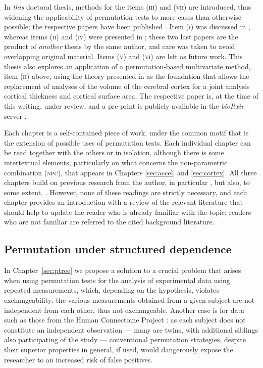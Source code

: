 In \emph{this} doctoral thesis, methods for the items (\textsc{iii}) and (\textsc{vii}) are introduced, thus widening the applicability of permutation tests to more cases than otherwise possible; the respective papers have been published \citep{Winkler2015, Winkler2016_fast}. Item (\textsc{i}) was discussed in \citet{Winkler2014}, whereas items (\textsc{ii}) and (\textsc{iv}) were presented in \citet{Winkler2016_npc}; these two last papers are the product of \emph{another} thesis by the same author, and care was taken to avoid overlapping original material. Items (\textsc{v}) and (\textsc{vi}) are left as future work. This thesis also explores an application of a permutation-based multivariate method, item (\textsc{ii}) above, using the theory presented in \citet{Winkler2016_npc} as the foundation that allows the replacement of analyses of the volume of the cerebral cortex for a joint analysis cortical thickness and cortical surface area. The respective paper is, at the time of this writing, under review, and a pre-print is publicly available in the \emph{bioRxiv} server \citep{Winkler2016_joint}.

Each chapter is a self-contained piece of work, under the common motif that is the extension of possible uses of permutation tests. Each individual chapter can be read together with the others or in isolation, although there is some intertextual elements, particularly on what concerns the non-parametric combination (\textsc{npc}), that appears in Chapters \ref{sec:accel} and \ref{sec:cortex}. All three chapters build on previous research from the author, in particular \citet{Winkler2014, Winkler2016_npc}, but also, to some extent, \citet{Winkler2010, Winkler2012}. However, none of these readings are strictly necessary, and each chapter provides an introduction with a review of the relevant literature that should help to update the reader who is already familiar with the topic; readers who are not familiar are referred to the cited background literature.

\subsection{Permutation under structured dependence}

In Chapter~\ref{sec:ptree} we propose a solution to a crucial problem that arises when using permutation tests for the analysis of experimental data using repeated measurements, which, depending on the hypothesis, violates exchangeability: the various measurements obtained from a given subject are not independent from each other, thus not exchangeable. Another case is for data such as those from the Human Connectome Project \citep[\textsc{hcp};][]{VanEssen2012,VanEssen2013}: as each subject does not constitute an independent observation --- many are twins, with additional siblings also participating of the study --- conventional permutation strategies, despite their superior properties in general, if used, would dangerously expose the researcher to an increased risk of false positives.

